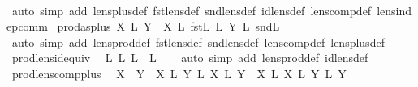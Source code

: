 \begin{isabellebody}
%
\isadelimproof
\ \ %
\endisadelimproof
%
\isatagproof
{}\isamarkupfalse%
\ {\isacharparenleft}auto\ simp\ add{\isacharcolon}\ lens{\isacharunderscore}plus{\isacharunderscore}def\ fst{\isacharunderscore}lens{\isacharunderscore}def\ snd{\isacharunderscore}lens{\isacharunderscore}def\ id{\isacharunderscore}lens{\isacharunderscore}def\ lens{\isacharunderscore}comp{\isacharunderscore}def\ lens{\isacharunderscore}indep{\isacharunderscore}comm{\isacharparenright}%
\endisatagproof
{\isafoldproof}%
%
\isadelimproof
\isanewline
%
\endisadelimproof
\isanewline
{}\isamarkupfalse%
\ prod{\isacharunderscore}as{\isacharunderscore}plus{\isacharcolon}\ {\isachardoublequoteopen}X\ {\isasymtimes}\isactrlsub L\ Y\ {\isacharequal}\ X\ {\isacharsemicolon}\isactrlsub L\ fst\isactrlsub L\ {\isacharplus}\isactrlsub L\ Y\ {\isacharsemicolon}\isactrlsub L\ snd\isactrlsub L{\isachardoublequoteclose}\isanewline
%
\isadelimproof
\ \ %
\endisadelimproof
%
\isatagproof
{}\isamarkupfalse%
\ {\isacharparenleft}auto\ simp\ add{\isacharcolon}\ lens{\isacharunderscore}prod{\isacharunderscore}def\ fst{\isacharunderscore}lens{\isacharunderscore}def\ snd{\isacharunderscore}lens{\isacharunderscore}def\ lens{\isacharunderscore}comp{\isacharunderscore}def\ lens{\isacharunderscore}plus{\isacharunderscore}def{\isacharparenright}%
\endisatagproof
{\isafoldproof}%
%
\isadelimproof
\isanewline
%
\endisadelimproof
\isanewline
{}\isamarkupfalse%
\ prod{\isacharunderscore}lens{\isacharunderscore}id{\isacharunderscore}equiv{\isacharcolon}\isanewline
\ \ {\isachardoublequoteopen}{}\isactrlsub L\ {\isasymtimes}\isactrlsub L\ {}\isactrlsub L\ {\isacharequal}\ {}\isactrlsub L{\isachardoublequoteclose}\isanewline
%
\isadelimproof
\ \ %
\endisadelimproof
%
\isatagproof
{}\isamarkupfalse%
\ {\isacharparenleft}auto\ simp\ add{\isacharcolon}\ lens{\isacharunderscore}prod{\isacharunderscore}def\ id{\isacharunderscore}lens{\isacharunderscore}def{\isacharparenright}%
\endisatagproof
{\isafoldproof}%
%
\isadelimproof
\isanewline
%
\endisadelimproof
\ \ \ \ \isanewline
{}\isamarkupfalse%
\ prod{\isacharunderscore}lens{\isacharunderscore}comp{\isacharunderscore}plus{\isacharcolon}\isanewline
\ \ {\isachardoublequoteopen}X\ {\isasymbowtie}\ Y\ {\isasymLongrightarrow}\ {\isacharparenleft}{\isacharparenleft}X\ {\isasymtimes}\isactrlsub L\ Y\ {\isacharsemicolon}\isactrlsub L\ {\isacharparenleft}X\ {\isacharplus}\isactrlsub L\ Y\ {\isacharequal}\ {\isacharparenleft}X\ {\isacharsemicolon}\isactrlsub L\ X\ {\isacharplus}\isactrlsub L\ {\isacharparenleft}Y\ {\isacharsemicolon}\isactrlsub L\ Y\isanewline

\end{isabellebody}
